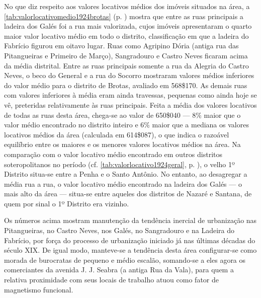 
No que diz respeito aos valores locativos médios dos imóveis situados na área, a \autoref{tab:valorlocativomedio1924brotas} (p. \pageref{tab:valorlocativomedio1924brotas}) mostra que entre as ruas principais a ladeira dos Galés foi a rua mais valorizada, cujos imóveis apresentaram o quarto maior valor locativo médio em todo o distrito, classificação em que a ladeira do Fabrício figurou em oitavo lugar. Ruas como Agripino Dória (antiga rua das Pitangueiras e Primeiro de Março), Sangradouro e Castro Neves ficaram acima da média distrital. Entre as ruas principais somente a rua da Alegria do Castro Neves, o beco do General e a rua do Socorro mostraram valores médios inferiores do valor médio para o distrito de Brotas, avaliado em 568\$170. As demais ruas com valores inferiores à média eram ainda travessas, pequenas como ainda hoje se vê, preteridas relativamente às ruas principais. Feita a média dos valores locativos de todas as ruas desta área, chega-se ao valor de 650\$040 --- 8\% maior que o valor médio encontrado no distrito inteiro e 6\% maior que a mediana os valores locativos médios da área (calculada em 614\$087), o que indica o razoável equilíbrio entre os maiores e os menores valores locativos médios na área. Na comparação com o valor locativo médio encontrado em outros distritos soteropolitanos no período (cf. \autoref{tab:valorlocativo1924geral}, p. \pageref{tab:valorlocativo1924geral}), o velho 1º Distrito situa-se entre a Penha e o Santo Antônio. No entanto, ao desagregar a média rua a rua, o valor locativo médio encontrado na ladeira dos Galés --- o mais alto da área --- situa-se entre aqueles dos distritos de Nazaré e Santana, de quem por sinal o 1º Distrito era vizinho.


Os números acima mostram manutenção da tendência inercial de urbanização nas Pitangueiras, no Castro Neves, nos Galés, no Sangradouro e na Ladeira do Fabrício, por força do processo de urbanização iniciado já nas últimas décadas do século XIX. De igual modo, manteve-se a tendência desta área configurar-se como morada de burocratas de pequeno e médio escalão, somando-se a eles agora os comerciantes da avenida J. J. Seabra (a antiga Rua da Vala), para quem a relativa proximidade com seus locais de trabalho atuou como fator de magnetismo funcional.


